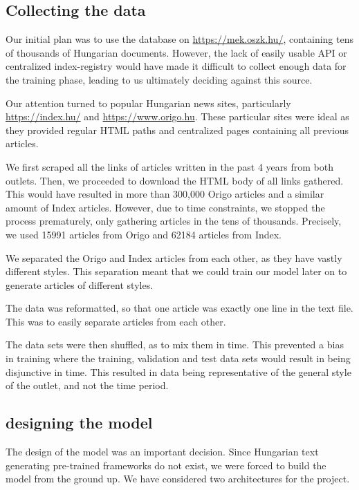 \documentclass[journal]{IEEEtai}
\begin{document}
\subsection{Collecting the data}
Our initial plan was to use the database on \href{https://mek.oszk.hu/}{https://mek.oszk.hu/}, containing tens of thousands of Hungarian documents. However, the lack of easily usable API or centralized index-registry would have made it difficult to collect enough data for the training phase, leading to us ultimately deciding against this source.

Our attention turned to popular Hungarian news sites, particularly \href{https://index.hu/}{https://index.hu/} and \href{https://www.origo.hu}{https://www.origo.hu}. These particular sites were ideal as they provided regular HTML paths and centralized pages containing all previous articles. 

We first scraped all the links of articles written in the past 4 years from both outlets. Then, we proceeded to download the HTML body of all links gathered. This would have resulted in more than 300,000 Origo articles and a similar amount of Index articles. However, due to time constraints, we stopped the process prematurely, only gathering articles in the tens of thousands. Precisely, we used 15991 articles from Origo and 62184 articles from Index.

We separated the Origo and Index articles from each other, as they have vastly different styles. This separation meant that we could train our model later on to generate articles of different styles. 

The data was reformatted, so that one article was exactly one line in the text file. This was to easily separate articles from each other.

The data sets were then shuffled, as to mix them in time. This prevented a bias in training where the training, validation and test data sets would result in being disjunctive in time. This resulted in data being representative of the general style of the outlet, and not the time period. 

\subsection{designing the model}
The design of the model was an important decision. Since Hungarian text generating pre-trained frameworks do not exist, we were forced to build the model from the ground up. We have considered two architectures for the project. 
\end{document}
